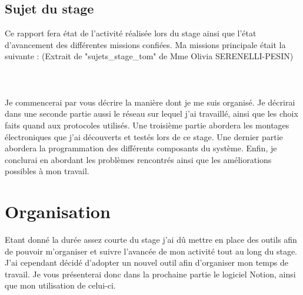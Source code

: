 \documentclass[12pt,french,a4paper]{article}
\begin{document}
\subsection{Sujet du stage}
Ce rapport fera état de l'activité réalisée lors du stage ainsi que l'état d'avancement des différentes missions confiées. Ma missions principale était la suivante : (Extrait de "sujets\_stage\_tom" de Mme Olivia SERENELLI-PESIN) 
\\
\\
\\
\\
Je commencerai par vous décrire la manière dont je me suis organisé. Je décrirai dans une seconde partie aussi le réseau sur lequel j'ai travaillé, ainsi que les choix faits quand aux protocoles utilisés. Une troisième partie abordera les montages électroniques que j'ai découverts et testés lors de ce stage. Une dernier partie abordera la programmation des différents composants du système. Enfin, je conclurai en abordant les problèmes rencontrés ainsi que les améliorations possibles à mon travail.

\section{Organisation}
Etant donné la durée assez courte du stage j'ai dû mettre en place des outils afin de pouvoir m'organiser et suivre l'avancée de mon activité tout au long du stage.
\\
J'ai cependant décidé d'adopter un nouvel outil afin d'organiser mon temps de travail. Je vous présenterai donc dans la prochaine partie le logiciel Notion, ainsi que mon utilisation de celui-ci.
\end{document}
